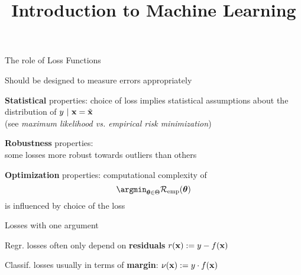 \documentclass[11pt,compress,t,notes=noshow, xcolor=table]{beamer}
\title{Introduction to Machine Learning}
\begin{document}
    

\begin{framei}[sep=L]{The role of Loss Functions}

\item Should be designed to measure errors appropriately

\item \textbf{Statistical} properties: choice of loss implies statistical assumptions about the distribution of $y ~|~ \mathbf{x} = \tilde{\mathbf{x}}$ \\
(see \emph{maximum likelihood vs. empirical risk minimization})
\item \textbf{Robustness} properties: \\
some losses more robust towards outliers than others
\item \textbf{Optimization} properties: computational complexity of
$$
\argmint \risket
$$
is influenced by choice of the loss 


\end{framei}



\begin{framei}[sep=M]{Losses with one argument}


\item Regr. losses often only depend on  \textbf{residuals} 
$r(\mathbf{x}) := y - f(\mathbf{x})$

\item Classif. losses usually in terms of 
  \textbf{margin}: $\nu(\mathbf{x})  := y \cdot f(\mathbf{x})$

\vfill


\end{framei}
\end{document}
